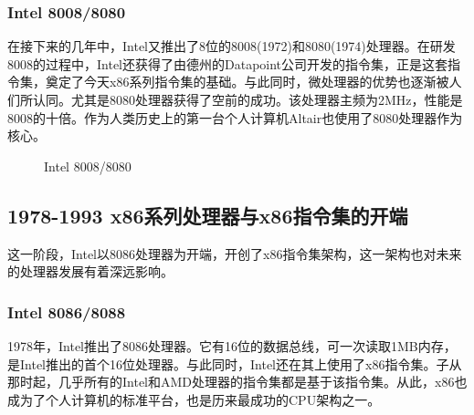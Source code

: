 \documentclass[UTF8]{ctexart}
\begin{document}
\subsubsection{Intel 8008/8080}
在接下来的几年中，Intel又推出了8位的8008(1972)和8080(1974)处理器。在研发8008的过程中，Intel还获得了由德州的Datapoint公司开发的指令集，正是这套指令集，奠定了今天x86系列指令集的基础。与此同时，微处理器的优势也逐渐被人们所认同。尤其是8080处理器获得了空前的成功。该处理器主频为2MHz，性能是8008的十倍。作为人类历史上的第一台个人计算机Altair也使用了8080处理器作为核心。
\begin{figure}[H]
    \centering
    \caption{Intel 8008/8080}
\end{figure}

\subsection{1978-1993 x86系列处理器与x86指令集的开端}
这一阶段，Intel以8086处理器为开端，开创了x86指令集架构，这一架构也对未来的处理器发展有着深远影响。
\subsubsection{Intel 8086/8088}
1978年，Intel推出了8086处理器。它有16位的数据总线，可一次读取1MB内存，是Intel推出的首个16位处理器。与此同时，Intel还在其上使用了x86指令集。子从那时起，几乎所有的Intel和AMD处理器的指令集都是基于该指令集。从此，x86也成为了个人计算机的标准平台，也是历来最成功的CPU架构之一。
\end{document}
